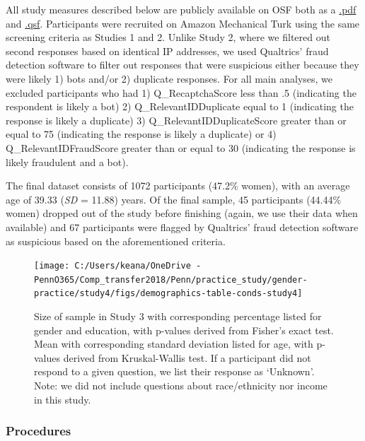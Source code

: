 \documentclass[a4paper, nobind]{templates/ociamthesis}
\begin{document}
All study measures described below are publicly available on OSF both as a \href{https://osf.io/yfd2j/}{.pdf} and \href{https://osf.io/vhzy5/}{.qsf}. Participants were recruited on Amazon Mechanical Turk using the same screening criteria as Studies 1 and 2. Unlike Study 2, where we filtered out second responses based on identical IP addresses, we used Qualtrics' fraud detection software to filter out responses that were suspicious either because they were likely 1) bots and/or 2) duplicate responses. For all main analyses, we excluded participants who had 1) Q\_RecaptchaScore less than .5 (indicating the respondent is likely a bot) 2) Q\_RelevantIDDuplicate equal to 1 (indicating the response is likely a duplicate) 3) Q\_RelevantIDDuplicateScore greater than or equal to 75 (indicating the response is likely a duplicate) or 4) Q\_RelevantIDFraudScore greater than or equal to 30 (indicating the response is likely fraudulent and a bot).

The final dataset consists of 1072 participants (47.2\% women), with an average age of 39.33 (\emph{SD} = 11.88) years. Of the final sample, 45 participants (44.44\% women) dropped out of the study before finishing (again, we use their data when available) and 67 participants were flagged by Qualtrics' fraud detection software as suspicious based on the aforementioned criteria.

\begin{figure}

{\centering \texttt{[image: C:/Users/keana/OneDrive - PennO365/Comp\_transfer2018/Penn/practice\_study/gender-practice/study4/figs/demographics-table-conds-study4]} 

}

\caption{Size of sample in Study 3 with corresponding percentage listed for gender and education, with p-values derived from Fisher’s exact test. Mean with corresponding standard deviation listed for age, with p-values derived from Kruskal-Wallis test. If a participant did not respond to a given question, we list their response as ‘Unknown’. Note: we did not include questions about race/ethnicity nor income in this study.}\label{fig:demographics-table-study4}
\end{figure}

\hypertarget{procedures-2}{%
\subsubsection{Procedures}\label{procedures-2}}
\end{document}
